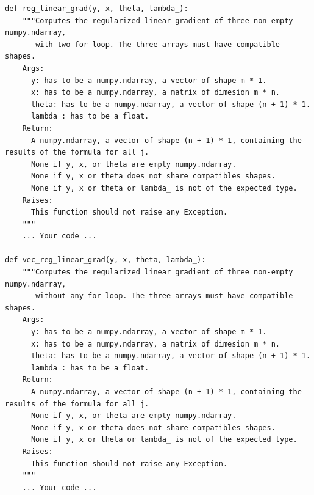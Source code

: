 \documentclass{42-en}
\begin{document}
\begin{verbatim}
def reg_linear_grad(y, x, theta, lambda_):
    """Computes the regularized linear gradient of three non-empty numpy.ndarray,
       with two for-loop. The three arrays must have compatible shapes.
    Args:
      y: has to be a numpy.ndarray, a vector of shape m * 1.
      x: has to be a numpy.ndarray, a matrix of dimesion m * n.
      theta: has to be a numpy.ndarray, a vector of shape (n + 1) * 1.
      lambda_: has to be a float.
    Return:
      A numpy.ndarray, a vector of shape (n + 1) * 1, containing the results of the formula for all j.
      None if y, x, or theta are empty numpy.ndarray.
      None if y, x or theta does not share compatibles shapes.
      None if y, x or theta or lambda_ is not of the expected type.
    Raises:
      This function should not raise any Exception.
    """
    ... Your code ...

def vec_reg_linear_grad(y, x, theta, lambda_):
    """Computes the regularized linear gradient of three non-empty numpy.ndarray,
       without any for-loop. The three arrays must have compatible shapes.
    Args:
      y: has to be a numpy.ndarray, a vector of shape m * 1.
      x: has to be a numpy.ndarray, a matrix of dimesion m * n.
      theta: has to be a numpy.ndarray, a vector of shape (n + 1) * 1.
      lambda_: has to be a float.
    Return:
      A numpy.ndarray, a vector of shape (n + 1) * 1, containing the results of the formula for all j.
      None if y, x, or theta are empty numpy.ndarray.
      None if y, x or theta does not share compatibles shapes.
      None if y, x or theta or lambda_ is not of the expected type.
    Raises:
      This function should not raise any Exception.
    """
    ... Your code ...
\end{verbatim}


\end{document}
